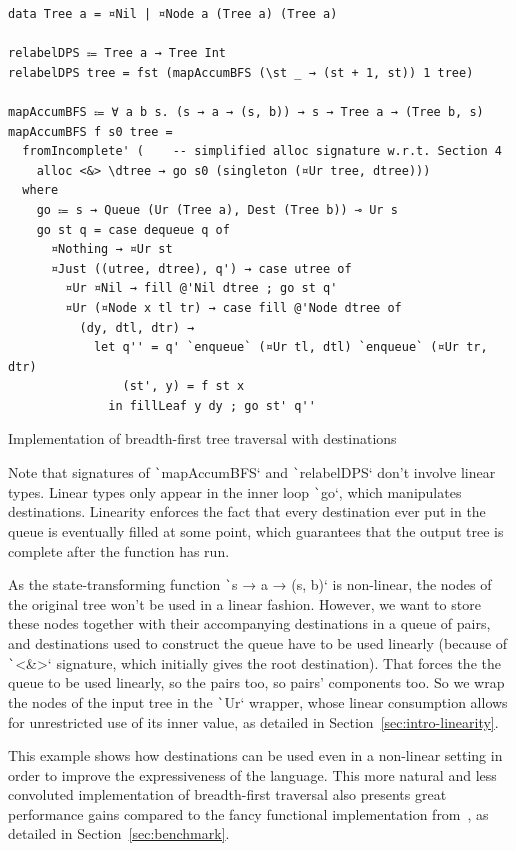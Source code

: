 \documentclass[english]{jflart}
\begin{document}
\begin{table}[t]
\small
\begin{verbatim}
data Tree a = ¤Nil | ¤Node a (Tree a) (Tree a)

relabelDPS ⩴ Tree a → Tree Int
relabelDPS tree = fst (mapAccumBFS (\st _ → (st + 1, st)) 1 tree)

mapAccumBFS ⩴ ∀ a b s. (s → a → (s, b)) → s → Tree a → (Tree b, s)
mapAccumBFS f s0 tree =
  fromIncomplete' (    -- simplified alloc signature w.r.t. Section 4
    alloc <&> \dtree → go s0 (singleton (¤Ur tree, dtree)))
  where
    go ⩴ s → Queue (Ur (Tree a), Dest (Tree b)) ⊸ Ur s
    go st q = case dequeue q of
      ¤Nothing → ¤Ur st
      ¤Just ((utree, dtree), q') → case utree of
        ¤Ur ¤Nil → fill @'Nil dtree ; go st q'
        ¤Ur (¤Node x tl tr) → case fill @'Node dtree of
          (dy, dtl, dtr) →
            let q'' = q' `enqueue` (¤Ur tl, dtl) `enqueue` (¤Ur tr, dtr)
                (st', y) = f st x
              in fillLeaf y dy ; go st' q''
\end{verbatim}
\caption{Implementation of breadth-first tree traversal with destinations}
\label{table:impl-bfs-tree-traversal}
\end{table}

Note that signatures of \texttt`mapAccumBFS` and \texttt`relabelDPS` don't involve linear types. Linear types only appear in the inner loop \texttt`go`, which manipulates destinations. Linearity enforces the fact that every destination ever put in the queue is eventually filled at some point, which guarantees that the output tree is complete after the function has run.

As the state-transforming function \texttt`s → a → (s, b)` is non-linear, the nodes of the original tree won't be used in a linear fashion. However, we want to store these nodes together with their accompanying destinations in a queue of pairs, and destinations used to construct the queue have to be used linearly (because of \texttt`<&>` signature, which initially gives the root destination). That forces the the queue to be used linearly, so the pairs too, so pairs' components too. So we wrap the nodes of the input tree in the \texttt`Ur` wrapper, whose linear consumption allows for unrestricted use of its inner value, as detailed in Section~\ref{sec:intro-linearity}.

This example shows how destinations can be used even in a non-linear setting in order to improve the expressiveness of the language. This more natural and less convoluted implementation of breadth-first traversal also presents great performance gains compared to the fancy functional implementation from~\cite{gibbons_phases_2023}, as detailed in Section~\ref{sec:benchmark}.
\end{document}
